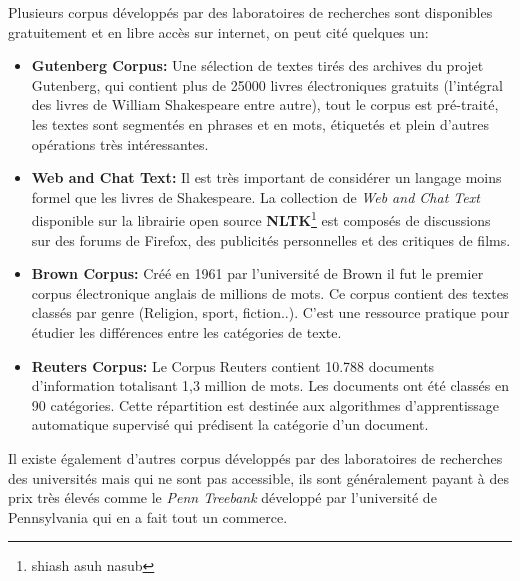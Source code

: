 \documentclass{report}
\begin{document}
    Plusieurs corpus développés par des laboratoires de recherches sont disponibles gratuitement et en libre accès sur internet, on peut cité quelques un:
    \begin{itemize}
        \item \textbf{Gutenberg Corpus:} Une sélection de textes tirés des archives du projet Gutenberg, qui contient plus de 25000 livres électroniques gratuits (l'intégral des livres de William Shakespeare entre autre), tout le corpus est pré-traité, les textes sont segmentés en phrases et en mots, étiquetés et plein d'autres opérations très intéressantes.
        \item \textbf{Web and Chat Text:} Il est très important de considérer un langage moins formel que les livres de Shakespeare. La collection de \emph{Web and Chat Text} disponible sur la librairie open source \textbf{NLTK}\footnote{shiash asuh nasub} est composés de discussions sur des forums de Firefox, des publicités personnelles et des critiques de films.
        \item \textbf{Brown Corpus:} Créé en 1961 par l'université de Brown il fut le premier corpus électronique anglais de millions de mots. Ce corpus contient des textes classés par genre (Religion, sport, fiction..). C'est une ressource pratique pour étudier les différences entre les catégories de texte.
        \item \textbf{Reuters Corpus:} Le Corpus Reuters contient 10.788 documents d'information totalisant 1,3 million de mots. Les documents ont été classés en 90 catégories. Cette répartition est destinée aux algorithmes d'apprentissage automatique supervisé qui prédisent la catégorie d'un document.
    \end{itemize} %

    Il existe également d'autres corpus développés par des laboratoires de recherches des universités mais qui ne sont pas accessible, ils sont généralement payant à des prix très élevés comme le \emph{Penn Treebank} développé par l'université de Pennsylvania qui en a fait tout un commerce.
\end{document}
